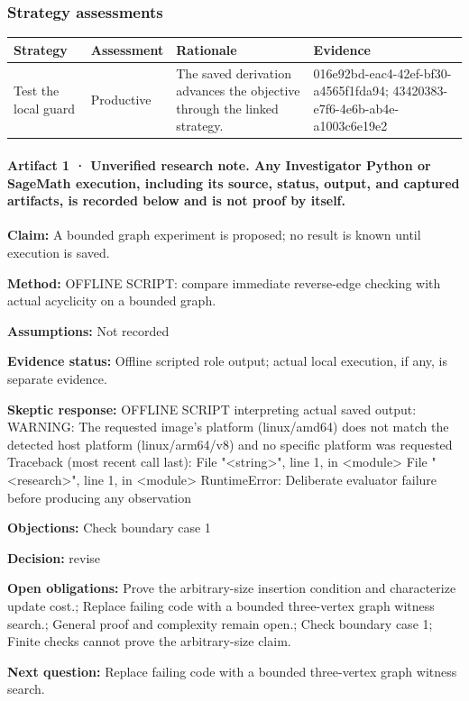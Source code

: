 \documentclass[11pt]{article}
\begin{document}
\subsubsection*{Strategy assessments}
\begin{longtable}{>{\raggedright\arraybackslash}p{.16\linewidth}>{\raggedright\arraybackslash}p{.15\linewidth}>{\raggedright\arraybackslash}p{.40\linewidth}>{\raggedright\arraybackslash}p{.17\linewidth}}
\toprule Strategy & Assessment & Rationale & Evidence \\
\midrule\endhead
Test the local guard & Productive & The saved derivation advances the objective through the linked strategy. & 016e92bd-eac4-42ef-bf30-a4565f1fda94; 43420383-e7f6-4e6b-ab4e-a1003c6e19e2 \\
\bottomrule
\end{longtable}
\paragraph{Artifact 1 · Unverified research note. Any Investigator Python or SageMath execution, including its source, status, output, and captured artifacts, is recorded below and is not proof by itself.}
\textbf{Claim:} A bounded graph experiment is proposed; no result is known until execution is saved.\par
\textbf{Method:} OFFLINE SCRIPT: compare immediate reverse-edge checking with actual acyclicity on a bounded graph.\par
\textbf{Assumptions:} Not recorded\par
\textbf{Evidence status:} Offline scripted role output; actual local execution, if any, is separate evidence.\par
\textbf{Skeptic response:} OFFLINE SCRIPT interpreting actual saved output: WARNING: The requested image's platform (linux/amd64) does not match the detected host platform (linux/arm64/v8) and no specific platform was requested
Traceback (most recent call last):
  File "\textless{}string\textgreater{}", line 1, in \textless{}module\textgreater{}
  File "\textless{}research\textgreater{}", line 1, in \textless{}module\textgreater{}
RuntimeError: Deliberate evaluator failure before producing any observation\par
\textbf{Objections:} Check boundary case 1\par
\textbf{Decision:} revise\par
\textbf{Open obligations:} Prove the arbitrary-size insertion condition and characterize update cost.; Replace failing code with a bounded three-vertex graph witness search.; General proof and complexity remain open.; Check boundary case 1; Finite checks cannot prove the arbitrary-size claim.\par
\textbf{Next question:} Replace failing code with a bounded three-vertex graph witness search.\par
\end{document}
